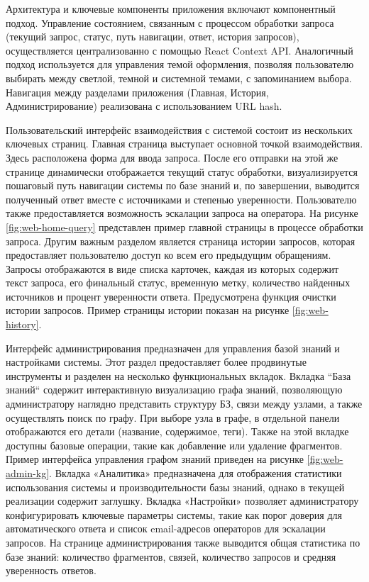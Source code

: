 Архитектура и ключевые компоненты приложения включают компонентный подход. Управление состоянием, связанным с процессом обработки запроса (текущий запрос, статус, путь навигации, ответ, история запросов), осуществляется централизованно с помощью React Context API. Аналогичный подход используется для управления темой оформления, позволяя пользователю выбирать между светлой, темной и системной темами, с запоминанием выбора. Навигация между разделами приложения (Главная, История, Администрирование) реализована с использованием URL hash.


Пользовательский интерфейс взаимодействия с системой состоит из нескольких ключевых страниц. Главная страница выступает основной точкой взаимодействия. Здесь расположена форма для ввода запроса. После его отправки на этой же странице динамически отображается текущий статус обработки, визуализируется пошаговый путь навигации системы по базе знаний и, по завершении, выводится полученный ответ вместе с источниками и степенью уверенности. Пользователю также предоставляется возможность эскалации запроса на оператора. На рисунке \ref{fig:web-home-query} представлен пример главной страницы в процессе обработки запроса. Другим важным разделом является страница истории запросов, которая предоставляет пользователю доступ ко всем его предыдущим обращениям. Запросы отображаются в виде списка карточек, каждая из которых содержит текст запроса, его финальный статус, временную метку, количество найденных источников и процент уверенности ответа. Предусмотрена функция очистки истории запросов. Пример страницы истории показан на рисунке \ref{fig:web-history}.


Интерфейс администрирования предназначен для управления базой знаний и настройками системы. Этот раздел предоставляет более продвинутые инструменты и разделен на несколько функциональных вкладок. Вкладка ``База знаний`` содержит интерактивную визуализацию графа знаний, позволяющую администратору наглядно представить структуру БЗ, связи между узлами, а также осуществлять поиск по графу. При выборе узла в графе, в отдельной панели отображаются его детали (название, содержимое, теги). Также на этой вкладке доступны базовые операции, такие как добавление или удаление фрагментов. Пример интерфейса управления графом знаний приведен на рисунке \ref{fig:web-admin-kg}. Вкладка «Аналитика» предназначена для отображения статистики использования системы и производительности базы знаний, однако в текущей реализации содержит заглушку. Вкладка «Настройки» позволяет администратору конфигурировать ключевые параметры системы, такие как порог доверия для автоматического ответа и список email-адресов операторов для эскалации запросов. На странице администрирования также выводится общая статистика по базе знаний: количество фрагментов, связей, количество запросов и средняя уверенность ответов.

